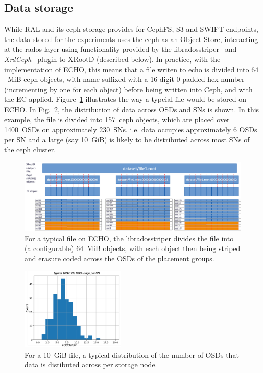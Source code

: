 \documentclass{webofc}
\begin{document}
\subsection{Data storage\label{datastore}}
While RAL and its ceph storage provides for CephFS, S3 and SWIFT endpoints, the data stored for the experiments uses the ceph as an Object Store, interacting at the rados layer using functionality provided by the libradosstriper~\cite{libradosstriper} and {\em XrdCeph}~\cite{libradosstriper} plugin to XRootD (described below). 
In practice, with the implementation of ECHO, this means that a file writen to echo is divided into $64$~MiB ceph objects, with name suffixed with a 16-digit 0-padded hex number (incrementing by one for each object) before being written into Ceph, and with the EC applied. Figure~\ref{fig_striper} illustrates the way a typcial file would be stored on ECHO. In Fig.~\ref{fig_osddist}, the distribution of data across OSDs and SNs is shown. In this example, the file is divided into 157~ceph objects, which are placed over 1400~OSDs on approximately 230~SNs. i.e. data occupies approximately 6 OSDs per SN and a large (say 10~GiB) is likely to be distributed across most SNs of the ceph cluster. 
%
\begin{figure}[h]
\centering
\includegraphics[width=\textwidth,clip]{figures/radosstriper.pdf}
\caption{For a typical file on ECHO, the libradosstriper divides the file into (a configurable) $64$~MiB objects, with each object then being striped and erasure coded across the OSDs of the placement groups.}
\label{fig_striper}       %
\end{figure}
%
\begin{figure}[h]
     \centering
     \includegraphics[width=5cm,clip]{figures/osds.pdf}
     \caption{For a 10~GiB file, a typical distribution of the number of OSDs that data is distibuted across per storage node.}
     \label{fig_osddist}       %
\end{figure}
\end{document}
